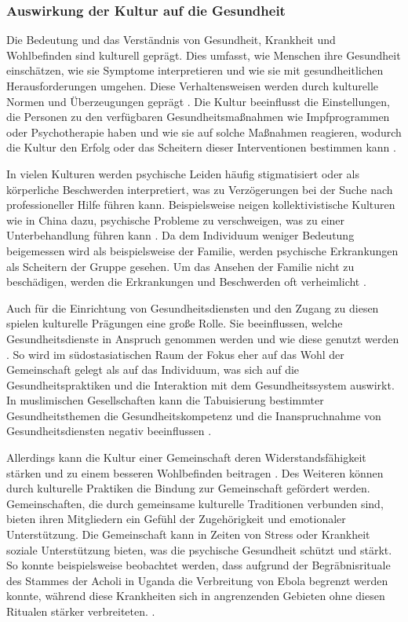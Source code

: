 \subsubsection{Auswirkung der Kultur auf die Gesundheit}    \label{subsubsec_2.1.2.2}
Die Bedeutung und das Verständnis von Gesundheit, Krankheit und Wohlbefinden sind kulturell geprägt. Dies umfasst, wie Menschen ihre Gesundheit einschätzen, wie sie Symptome interpretieren und wie sie mit gesundheitlichen Herausforderungen umgehen. Diese Verhaltensweisen werden durch kulturelle Normen und Überzeugungen geprägt \parencite{WHO2024, HernandezGibb2020}. Die Kultur beeinflusst die Einstellungen, die Personen zu den verfügbaren Gesundheitsmaßnahmen wie Impfprogrammen oder Psychotherapie haben und wie sie auf solche Maßnahmen reagieren, wodurch die Kultur den Erfolg oder das Scheitern dieser Interventionen bestimmen kann \parencite{WHO2024}.

In vielen Kulturen werden psychische Leiden häufig stigmatisiert oder als körperliche Beschwerden interpretiert, was zu Verzögerungen bei der Suche nach professioneller Hilfe führen kann. Beispielsweise neigen kollektivistische Kulturen wie in China dazu, psychische Probleme zu verschweigen, was zu einer Unterbehandlung führen kann \parencite{HernandezGibb2020}. Da dem Individuum weniger Bedeutung beigemessen wird als beispielsweise der Familie, werden psychische Erkrankungen als Scheitern der Gruppe gesehen. Um das Ansehen der Familie nicht zu beschädigen, werden die Erkrankungen und Beschwerden oft verheimlicht \parencite{KaraszEtAl2019}.

Auch für die Einrichtung von Gesundheitsdiensten und den Zugang zu diesen spielen kulturelle Prägungen eine große Rolle. Sie beeinflussen, welche Gesundheitsdienste in Anspruch genommen werden und wie diese genutzt werden \parencite{WHO2024}. So wird im südostasiatischen Raum der Fokus eher auf das Wohl der Gemeinschaft gelegt als auf das Individuum, was sich auf die Gesundheitspraktiken und die Interaktion mit dem Gesundheitssystem auswirkt. In muslimischen Gesellschaften kann die Tabuisierung bestimmter Gesundheitsthemen die Gesundheitskompetenz und die Inanspruchnahme von Gesundheitsdiensten negativ beeinflussen \parencite{WielgaKnospe2023}.

Allerdings kann die Kultur einer Gemeinschaft deren Widerstandsfähigkeit stärken und zu einem besseren Wohlbefinden beitragen \parencite{WHO2024}. Des Weiteren können durch kulturelle Praktiken die Bindung zur Gemeinschaft gefördert werden. Gemeinschaften, die durch gemeinsame kulturelle Traditionen verbunden sind, bieten ihren Mitgliedern ein Gefühl der Zugehörigkeit und emotionaler Unterstützung. Die Gemeinschaft kann in Zeiten von Stress oder Krankheit soziale Unterstützung bieten, was die psychische Gesundheit schützt und stärkt. So konnte beispielsweise beobachtet werden, dass aufgrund der Begräbnisrituale des Stammes der Acholi in Uganda die Verbreitung von Ebola begrenzt werden konnte, während diese Krankheiten sich in angrenzenden Gebieten ohne diesen Ritualen stärker verbreiteten. \parencite{Hewlett2008}. 









